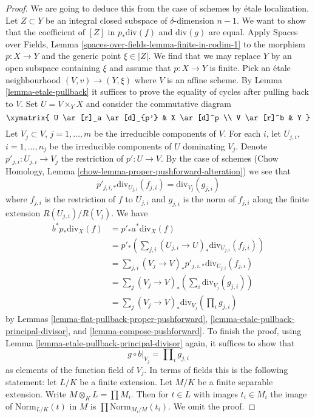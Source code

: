 \begin{proof}
We are going to deduce this from the case of schemes by \'etale localization.
Let $Z \subset Y$ be an integral closed subspace of $\delta$-dimension
$n - 1$. We want to show that the coefficient of $[Z]$ in
$p_*\text{div}(f)$ and $\text{div}(g)$ are equal. Apply
Spaces over Fields, Lemma \ref{spaces-over-fields-lemma-finite-in-codim-1}
to the morphism $p : X \to Y$ and the generic point $\xi \in |Z|$.
We find that we may replace $Y$ by an open subspace containing $\xi$
and assume that $p : X \to Y$ is finite. Pick an \'etale neighbourhood
$(V, v) \to (Y, \xi)$ where $V$ is an affine scheme.
By Lemma \ref{lemma-etale-pullback} it suffices to prove the equality
of cycles after pulling back to $V$.
Set $U = V \times_Y X$ and consider the commutative diagram
$$
\xymatrix{
U \ar[r]_a \ar[d]_{p'} & X \ar[d]^p \\
V \ar[r]^b & Y
}
$$
Let $V_j \subset V$, $j = 1, \ldots, m$ be the irreducible components
of $V$. For each $i$, let $U_{j, i}$, $i = 1, \ldots, n_j$ be the
irreducible components of $U$ dominating $V_j$. Denote
$p'_{j, i} : U_{j, i} \to V_j$ the restriction of $p' : U \to V$.
By the case of schemes
(Chow Homology, Lemma \ref{chow-lemma-proper-pushforward-alteration})
we see that
$$
p'_{j, i, *}\text{div}_{U_{j, i}}(f_{j, i}) = \text{div}_{V_j}(g_{j, i})
$$
where $f_{j, i}$ is the restriction of $f$ to $U_{j, i}$ and
$g_{j, i}$ is the norm of $f_{j, i}$ along the finite extension
$R(U_{j, i})/R(V_j)$. We have
\begin{align*}
b^* p_*\text{div}_X(f)
& =
p'_* a^* \text{div}_X(f) \\
& =
p'_*\left(\sum\nolimits_{j, i}
(U_{j, i} \to U)_*\text{div}_{U_{j, i}}(f_{j, i})\right) \\
& =
\sum\nolimits_{j, i}
(V_j \to V)_*p'_{j, i, *}\text{div}_{U_{j, i}}(f_{j, i}) \\
& =
\sum\nolimits_j
(V_j \to V)_*\left(\sum\nolimits_i \text{div}_{V_j}(g_{j, i})\right) \\
& =
\sum\nolimits_j (V_j \to V)_*\text{div}_{V_j}(\prod\nolimits_i g_{j, i})
\end{align*}
by Lemmas
\ref{lemma-flat-pullback-proper-pushforward},
\ref{lemma-etale-pullback-principal-divisor}, and
\ref{lemma-compose-pushforward}.
To finish the proof, using Lemma \ref{lemma-etale-pullback-principal-divisor}
again, it suffices to show that
$$
g \circ b|_{V_j} = \prod\nolimits_i g_{j, i}
$$
as elements of the function field of $V_j$. In terms of fields
this is the following statement: let $L/K$ be a finite extension.
Let $M/K$ be a finite separable extension. Write
$M \otimes_K L = \prod M_i$. Then for $t \in L$ with images
$t_i \in M_i$ the image of
$\text{Norm}_{L/K}(t)$ in $M$ is $\prod \text{Norm}_{M_i/M}(t_i)$.
We omit the proof.
\end{proof}







